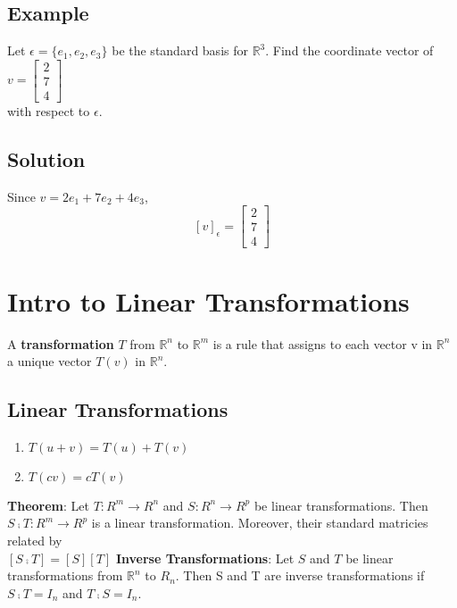 \subsection*{Example}
Let $\epsilon = \{e_1, e_2, e_3\}$ be the standard basis for $\mathbb{R}^3$. Find the coordinate vector of $v = \begin{bmatrix}
    2\\7\\4
\end{bmatrix}$\\ with respect to $\epsilon$.
\subsection*{Solution}
Since $v = 2e_1 + 7e_2 + 4e_3$, $$[v]_\epsilon = \begin{bmatrix}
    2\\7\\4
\end{bmatrix}$$

\section{Intro to Linear Transformations}
A \textbf{transformation} $T$ from $\mathbb{R}^n$ to $\mathbb{R}^m$ is a rule that assigns to each vector v in $\mathbb{R}^n$ a unique vector $T(v)$ in $\mathbb{R}^n$. 
\subsection*{Linear Transformations}
\begin{enumerate}
    \item $T(u+v) = T(u) + T(v)$
    \item $T(cv) = cT(v)$
\end{enumerate}
\textbf{Theorem}: Let $T: R^m\rightarrow R^n$ and $S: R^n\rightarrow R^p$ be linear transformations. Then $S\comp T: R^m\rightarrow R^p$ is a linear transformation. Moreover, their standard matricies related by\\
$[S\comp T] = [S][T]$
\textbf{Inverse Transformations}: Let $S$ and $T$ be linear transformations from $\mathbb{R}^n$ to $R_n$. Then S and T are inverse transformations if $S\comp T = I_n$ and $T\comp S = I_n$.